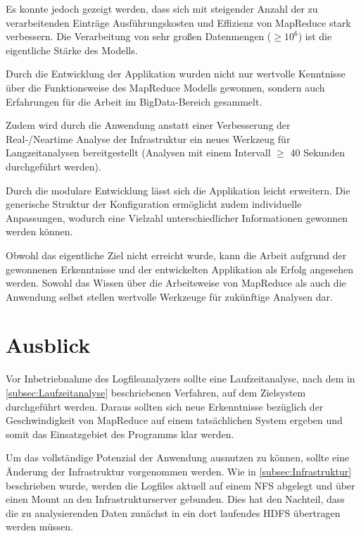 Es konnte jedoch gezeigt werden, dass sich mit steigender Anzahl der zu verarbeitenden Einträge Ausführungskosten und Effizienz von MapReduce stark verbessern. Die Verarbeitung von sehr großen Datenmengen ($\geq10^6$) ist die eigentliche Stärke des Modells.

Durch die Entwicklung der Applikation wurden nicht nur wertvolle Kenntnisse über die Funktionsweise des MapReduce Modells gewonnen, sondern auch Erfahrungen für die Arbeit im BigData-Bereich gesammelt.

Zudem wird durch die Anwendung anstatt einer Verbesserung der Real-/Neartime Analyse der Infrastruktur ein neues Werkzeug für Langzeitanalysen bereitgestellt (Analysen mit einem Intervall $\geq$ 40 Sekunden durchgeführt werden).

Durch die modulare Entwicklung lässt sich die Applikation leicht erweitern. Die generische Struktur der Konfiguration ermöglicht zudem individuelle Anpassungen, wodurch eine Vielzahl unterschiedlicher Informationen gewonnen werden können.

Obwohl das eigentliche Ziel nicht erreicht wurde, kann die Arbeit aufgrund der gewonnenen Erkenntnisse und der entwickelten Applikation als Erfolg angesehen werden. Sowohl das Wissen über die Arbeitsweise von MapReduce als auch die Anwendung selbst stellen wertvolle Werkzeuge für zukünftige Analysen dar.


\newpage
\section{Ausblick}\label{sec:Ausblick}
Vor Inbetriebnahme des Logfileanalyzers sollte eine Laufzeitanalyse, nach dem in \autoref{subsec:Laufzeitanalyse} beschriebenen Verfahren, auf dem Zielsystem durchgeführt werden. Daraus sollten sich neue Erkenntnisse bezüglich der Geschwindigkeit von MapReduce auf einem tatsächlichen System ergeben und somit das Einsatzgebiet des Programms klar werden.

Um das vollständige Potenzial der Anwendung ausnutzen zu können, sollte eine Änderung der Infrastruktur vorgenommen werden. Wie in \autoref{subsec:Infrastruktur} beschrieben wurde, werden die Logfiles aktuell auf einem \ac{NFS} abgelegt und über einen Mount an den Infrastrukturserver gebunden. Dies hat den Nachteil, dass die zu analysierenden Daten zunächst in ein dort laufendes \ac{HDFS} übertragen werden müssen.

